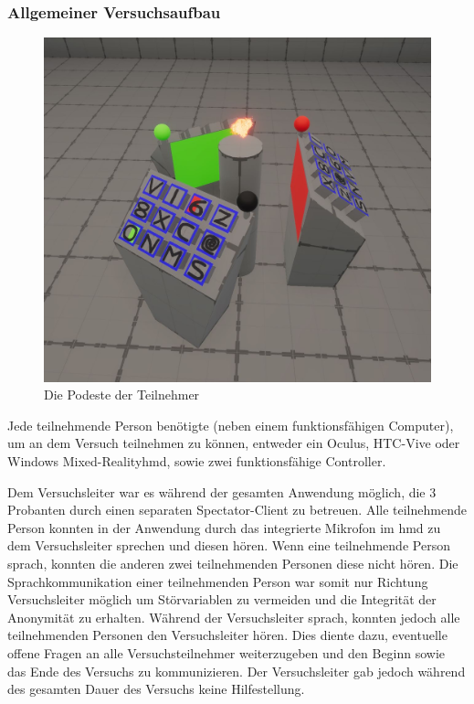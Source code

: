\documentclass[a4paper,11pt]{article}%
\renewcommand{\\}{\vspace*{0.5\baselineskip} \newline}
\begin{document}
	\subsubsection{Allgemeiner Versuchsaufbau}

\begin{figure}[h]
		\begin{footnotesize}
			\includegraphics[width=\textwidth]{Abbildungen/Podeste.JPG}
			
			\caption[Abbildung 1]{Die Podeste der Teilnehmer}
			\label{Podeste}
		\end{footnotesize}
	\end{figure}

Jede teilnehmende Person benötigte (neben einem funktionsfähigen Computer), um an dem Versuch teilnehmen zu können, entweder ein Oculus, HTC-Vive oder Windows Mixed-Reality\ac{hmd}, sowie zwei funktionsfähige Controller.

Dem Versuchsleiter war es während der gesamten Anwendung möglich, die 3 Probanten durch einen separaten Spectator-Client zu betreuen. Alle teilnehmende Person konnten in der Anwendung durch das integrierte Mikrofon im \ac{hmd} zu dem Versuchsleiter sprechen und diesen hören. Wenn eine teilnehmende Person sprach, konnten die anderen zwei teilnehmenden Personen diese nicht hören. Die Sprachkommunikation einer teilnehmenden Person war somit nur Richtung Versuchsleiter möglich um Störvariablen zu vermeiden und die Integrität der Anonymität zu erhalten.
Während der Versuchsleiter sprach, konnten jedoch alle teilnehmenden Personen den Versuchsleiter hören. Dies diente dazu, eventuelle offene Fragen an alle Versuchsteilnehmer weiterzugeben und den Beginn sowie das Ende des Versuchs zu kommunizieren. Der Versuchsleiter gab jedoch während des gesamten Dauer des Versuchs keine Hilfestellung.
\end{document}
